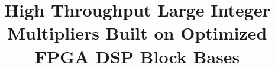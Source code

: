 
%

\title{High Throughput Large Integer Multipliers Built on Optimized FPGA DSP Block Bases}










